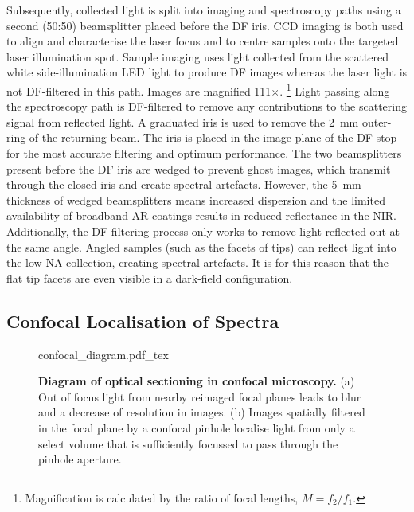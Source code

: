 \documentclass{article}
\begin{document}
Subsequently, collected light is split into imaging and spectroscopy paths using a second (50:50) beamsplitter placed before the DF iris. CCD imaging is both used to align and characterise the laser focus and to centre samples onto the targeted laser illumination spot. Sample imaging uses light collected from the scattered white side-illumination LED light to produce DF images whereas the laser light is not DF-filtered in this path. Images are magnified 111$\times$.%
\footnote{Magnification is calculated by the ratio of focal lengths, $M=f_2/f_1$.}
Light passing along the spectroscopy path is DF-filtered to remove any contributions to the scattering signal from reflected light. A graduated iris is used to remove the \SI{2}{mm} outer-ring of the returning beam. The iris is placed in the image plane of the DF stop for the most accurate filtering and optimum performance. The two beamsplitters present before the DF iris are wedged to prevent ghost images, which transmit through the closed iris and create spectral artefacts. However, the \SI{5}{mm} thickness of wedged beamsplitters means increased dispersion and the limited availability of broadband AR coatings results in reduced reflectance in the NIR. %
Additionally, the DF-filtering process only works to remove light reflected out at the same angle. Angled samples (such as the facets of tips) can reflect light into the low-NA collection, creating spectral artefacts. It is for this reason that the flat tip facets are even visible in a dark-field configuration.

\subsection{Confocal Localisation of Spectra}

\begin{figure}[bt]
\centering
\fontsize{10pt}{1em}\selectfont
{confocal_diagram.pdf_tex}
\caption[Diagram of optical sectioning in confocal microscopy]{\textbf{Diagram of optical sectioning in confocal microscopy.} (a) Out of focus light from nearby reimaged focal planes leads to blur and a decrease of resolution in images. (b) Images spatially filtered in the focal plane by a confocal pinhole localise light from only a select volume that is sufficiently focussed to pass through the pinhole aperture.}
\label{fig:confocal_diagram}
\end{figure}
\end{document}
